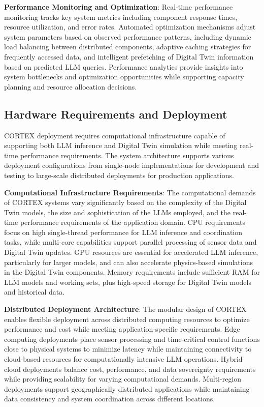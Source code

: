 \textbf{Performance Monitoring and Optimization}: Real-time performance monitoring tracks key system metrics including component response times, resource utilization, and error rates. Automated optimization mechanisms adjust system parameters based on observed performance patterns, including dynamic load balancing between distributed components, adaptive caching strategies for frequently accessed data, and intelligent prefetching of Digital Twin information based on predicted LLM queries. Performance analytics provide insights into system bottlenecks and optimization opportunities while supporting capacity planning and resource allocation decisions.

\subsection{Hardware Requirements and Deployment}

CORTEX deployment requires computational infrastructure capable of supporting both LLM inference and Digital Twin simulation while meeting real-time performance requirements. The system architecture supports various deployment configurations from single-node implementations for development and testing to large-scale distributed deployments for production applications.

\textbf{Computational Infrastructure Requirements}: The computational demands of CORTEX systems vary significantly based on the complexity of the Digital Twin models, the size and sophistication of the LLMs employed, and the real-time performance requirements of the application domain. CPU requirements focus on high single-thread performance for LLM inference and coordination tasks, while multi-core capabilities support parallel processing of sensor data and Digital Twin updates. GPU resources are essential for accelerated LLM inference, particularly for larger models, and can also accelerate physics-based simulations in the Digital Twin components. Memory requirements include sufficient RAM for LLM models and working sets, plus high-speed storage for Digital Twin models and historical data.

\textbf{Distributed Deployment Architecture}: The modular design of CORTEX enables flexible deployment across distributed computing resources to optimize performance and cost while meeting application-specific requirements. Edge computing deployments place sensor processing and time-critical control functions close to physical systems to minimize latency while maintaining connectivity to cloud-based resources for computationally intensive LLM operations. Hybrid cloud deployments balance cost, performance, and data sovereignty requirements while providing scalability for varying computational demands. Multi-region deployments support geographically distributed applications while maintaining data consistency and system coordination across different locations.


